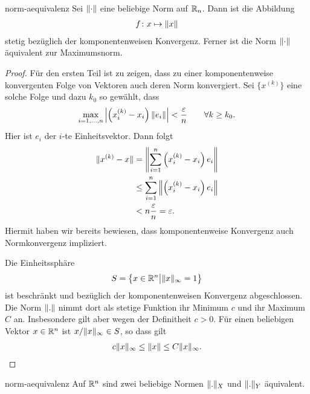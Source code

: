\begin{Lemma}{norm-aequivalenz}
  Sei $\lVert\cdot\rVert$ eine beliebige Norm auf $\mathbb R_n$. Dann ist die Abbildung
  \begin{gather}
    f\colon x \mapsto \lVert x\rVert
  \end{gather}
  stetig bezüglich der komponentenweisen Konvergenz. Ferner ist die
  Norm $\lVert\cdot\rVert$ äquivalent zur Maximumsnorm.
\end{Lemma}

\begin{proof}
  Für den ersten Teil ist zu zeigen, dass zu einer komponentenweise
  konvergenten Folge von Vektoren auch deren Norm konvergiert. Sei
  $\{x^{(k)}\}$ eine solche Folge und dazu $k_0$ so gewählt, dass
  \begin{gather}
    \max_{i=1,\dots,n}\left\lvert\left(x_i^{(k)}-x_i\right) \lVert e_i\rVert\right\rvert
      < \frac{\varepsilon} n
    \qquad \forall k\ge k_0.
  \end{gather}
  Hier ist $e_i$ der $i$-te Einheitsvektor. Dann folgt
  \begin{align}
    \lVert x^{(k)}-x\rVert
    &= \left\lVert\sum_{i=1}^n \left(x_i^{(k)}-x_i\right) e_i\right\rVert
    \\
    &\le \sum_{i=1}^n \left\lVert\left(x_i^{(k)}-x_i\right) e_i\right\rVert
    \\
    & < n \frac{\varepsilon} n = \varepsilon.
  \end{align}
  Hiermit haben wir bereits bewiesen, dass komponentenweise Konvergenz
  auch Normkonvergenz impliziert.

  Die \glqq{}Einheitssphäre\grqq{}
   \begin{gather}
     S = \bigl\{ x\in \mathbb R^n \big| \lVert x\rVert_\infty = 1 \bigr\}
   \end{gather}
   ist beschränkt und bezüglich der komponentenweisen Konvergenz
   abgeschlossen. Die Norm $\lVert.\rVert$ nimmt dort als stetige Funktion
   ihr Minimum $c$ und ihr Maximum $C$ an. Insbesondere gilt aber
   wegen der Definitheit $c > 0$. Für einen beliebigen Vektor
   $x\in \mathbb R^n$ ist $x/\lVert x\rVert_\infty \in S$, so dass gilt
   \begin{gather}
     c \lVert x\rVert_\infty \le \lVert x\rVert \le C \lVert x\rVert_\infty.
   \end{gather}
\end{proof}

\begin{Satz}{norm-aequivalenz}
  Auf $\mathbb R^n$ sind zwei beliebige Normen $\lVert.\rVert_X$ und $\lVert.\rVert_Y$ äquivalent.
\end{Satz}

